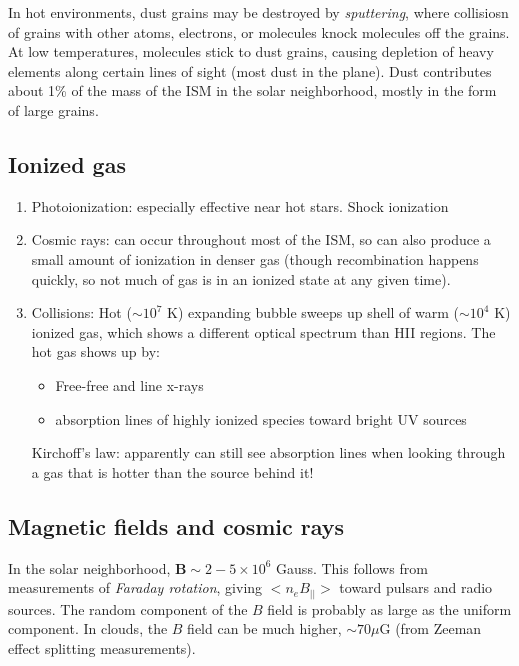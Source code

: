 \documentclass[12pt]{article}
\newcommand{\mar}[1]{\hspace{0pt}\marginpar{-\textcolor{black}{#1}-}}
\begin{document}
In hot environments, dust grains may be destroyed by \textit{sputtering}, where
collisiosn of grains with other atoms, electrons, or molecules knock molecules
off the grains. \mar{9}At low temperatures, molecules stick to dust grains,
causing depletion of heavy elements along certain lines of sight (most dust in
the plane). Dust contributes about 1\% of the mass of the ISM in the solar
neighborhood, mostly in the form of large grains.

\subsection{Ionized gas}
\begin{enumerate}[label=\alph*)]
    \item Photoionization: especially effective near hot stars. Shock
        ionization
    \item Cosmic rays: can occur throughout most of the ISM, so can also
        produce a small amount of ionization in denser gas (though
        recombination happens quickly, so not much of gas is in an
        ionized state at any given time).
    \item \mar{11}Collisions: Hot ($\sim 10^{7}$ K) expanding bubble
        sweeps up shell of warm ($\sim 10^{4}$ K) ionized gas, which shows
        a different optical spectrum than HII regions. The hot gas shows
        up by:
        \begin{itemize}
            \item Free-free and line x-rays
            \item absorption lines of highly ionized species toward
                bright UV sources
        \end{itemize}
        Kirchoff's law: apparently can still see absorption lines when looking
        through a gas that is hotter than the source behind it!
\end{enumerate}

\subsection{Magnetic fields and cosmic rays}
\mar{13}In the solar neighborhood, $\mathbf{B} \sim 2-5\times10^{6}$ Gauss.
This follows from measurements of \textit{Faraday rotation}, giving
$<n_{e}B_{||}>$ toward pulsars and radio sources. The random component of
the $B$ field is probably as large as the uniform component. In clouds,
the $B$ field can be much higher, $\sim 70 \mu$G (from Zeeman effect splitting
measurements).
\end{document}
